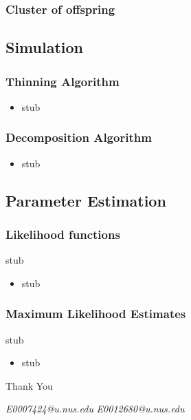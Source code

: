 \documentclass{beamer}
\begin{document}
\begin{frame}
\frametitle{Cluster of offspring}
\end{frame}

\subsection{Simulation}

\begin{frame}
\frametitle{Thinning Algorithm}
\begin{itemize}
	\item stub
\end{itemize}
\end{frame}

\begin{frame}
\frametitle{Decomposition Algorithm}
\begin{itemize}
	\item stub
\end{itemize}
\end{frame}

\subsection{Parameter Estimation}
\begin{frame}
\frametitle{Likelihood functions}
stub
\begin{itemize}
	\item stub
\end{itemize}
\end{frame}

\begin{frame}
\frametitle{Maximum Likelihood Estimates}
stub
\begin{itemize}
	\item stub
\end{itemize}
\end{frame}

\begin{frame}
\Huge{\centerline{Thank You}}
\begin{center}
\begin{normalsize}
\emph{E0007424@u.nus.edu}
\emph{E0012680@u.nus.edu}
\end{normalsize}
\end{center}
\end{frame}


\end{document}
